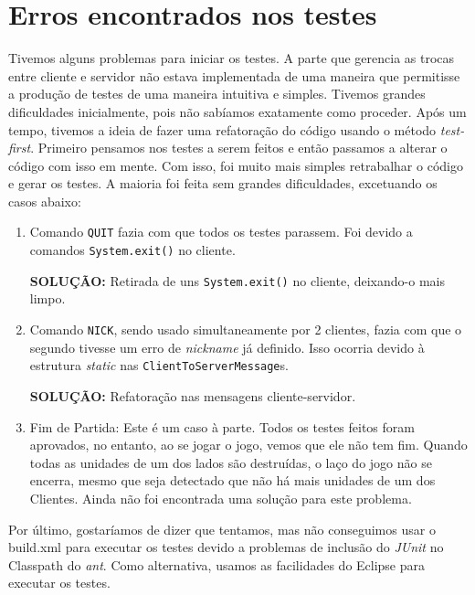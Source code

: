 \section{Erros encontrados nos testes}

Tivemos alguns problemas para iniciar os testes. A parte que gerencia as trocas
entre cliente e servidor não estava implementada de uma maneira que permitisse a
produção de testes de uma maneira intuitiva e simples. Tivemos grandes dificuldades
inicialmente, pois não sabíamos exatamente como proceder. Após um tempo, tivemos
a ideia de fazer uma refatoração do código usando o método \emph{test-first}.
Primeiro pensamos nos testes a serem feitos e então passamos a alterar o código
com isso em mente. Com isso, foi muito mais simples retrabalhar o código e gerar
os testes. A maioria foi feita sem grandes dificuldades, excetuando os casos abaixo:

\begin{enumerate}
    \item Comando \texttt{QUIT} fazia com que todos os testes parassem. Foi devido a
        comandos \texttt{System.exit()} no cliente.

       \textbf{SOLUÇÃO:} Retirada de uns \texttt{System.exit()} no cliente,
            deixando-o mais limpo.

    \item Comando \texttt{NICK}, sendo usado simultaneamente por 2 clientes, fazia
        com que o segundo tivesse um erro de \emph{nickname} já definido. Isso
        ocorria devido à estrutura \emph{static} nas \texttt{ClientToServerMessage}s.

       \textbf{SOLUÇÃO:} Refatoração nas mensagens cliente-servidor.

    \item Fim de Partida: Este é um caso à parte. Todos os testes feitos foram
        aprovados, no entanto, ao se jogar o jogo, vemos que ele não tem fim.
        Quando todas as unidades de um dos lados são destruídas, o laço do jogo não
        se encerra, mesmo que seja detectado que não há mais unidades de um dos
        Clientes. Ainda não foi encontrada uma solução para este problema.
\end{enumerate}

Por último, gostaríamos de dizer que tentamos, mas não conseguimos usar
o build.xml para executar os testes devido a problemas de inclusão do \emph{JUnit}
no Classpath do \emph{ant}. Como alternativa, usamos as facilidades do Eclipse para
executar os testes.
